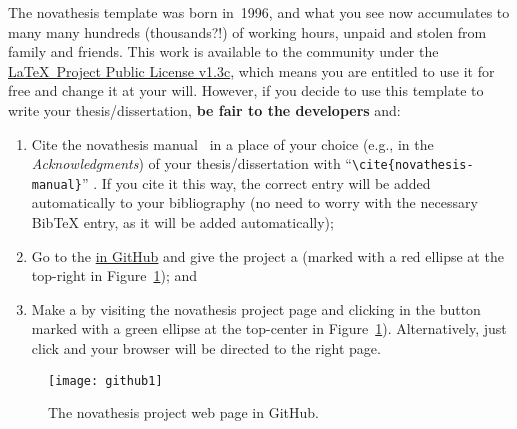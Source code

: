 The \gls{novathesis} template was born in~1996, and what you see now accumulates to many many hundreds (thousands?!) of working hours, unpaid and stolen from family and friends.  This work is available to the community under the \href{LaTeX project public license}{\LaTeX\ Project Public License v1.3c}, which means you are entitled to use it for free and change it at your will.  However, if you decide to use this template to write your thesis/dissertation, \textbf{be fair to the developers} and:
\begin{enumerate}
  \item {} Cite the \gls{novathesis} manual~\cite{novathesis-manual} in a place of your choice (e.g., in the \emph{Acknowledgments}) of your thesis/dissertation with “\verb!\cite{novathesis-manual}!” .  If you cite it this way, the correct entry will be added automatically to your bibliography (no need to worry with the necessary BibTeX entry, as it will be added automatically);
  \item Go to the
\href{https://github.com/joaomlourenco/novathesis}{ in GitHub} and give the project a  (marked with a red ellipse at the top-right in Figure~\ref{fig:github}); and
  \item Make a  by visiting the \gls{novathesis} project page and clicking in the button marked with a green ellipse at the top-center in Figure~\ref{fig:github}).  Alternatively, just click \href{https://www.paypal.com/donate/?hosted_button_id=8WA8FRVMB78W8}{} and your browser will be directed to the right page.
\end{enumerate}

\begin{figure}[htbp]
    \centering
    \texttt{[image: github1]}
    \caption{The \gls{novathesis} project web page in GitHub.}
    \label{fig:github}
\end{figure}